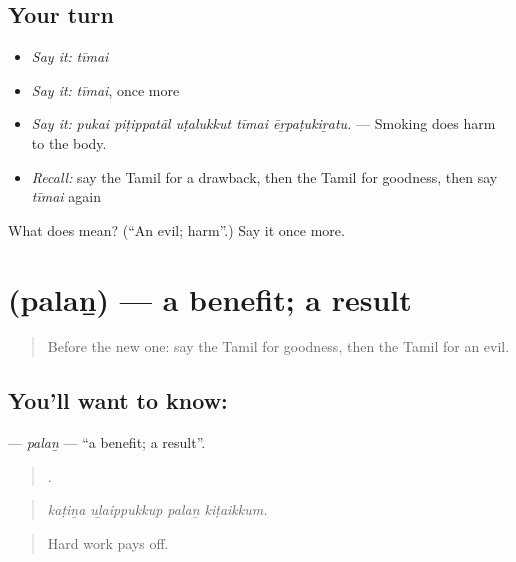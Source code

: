 \subsection*{Your turn}
\begin{itemize}
\raggedright
  \item \emph{Say it:} \emph{tīmai}
  \item \emph{Say it:} \emph{tīmai}, once more
  \item \emph{Say it:} \emph{pukai piṭippatāl uṭalukkut tīmai ēṟpaṭukiṟatu.} — Smoking does harm to the body.
  \item \emph{Recall:} say the Tamil for a drawback, then the Tamil for goodness, then say \emph{tīmai} again
\end{itemize}

\begin{tcolorbox}[breakable,colback=teal!4,colframe=teal!35!black,title={Before you move on}]
What does  mean? (\textquotedblleft{}An evil; harm\textquotedblright{}.) Say it once more.
\end{tcolorbox}
\section[\texorpdfstring{\ta{பலன்} (palaṉ)}{பலன் (palaṉ)}]{ (palaṉ) — a benefit; a result}

\label{lesson:TA-C353-palan}



\begin{quote}
Before the new one: say the Tamil for goodness, then the Tamil for an evil.
\end{quote}

\subsection*{You'll want to know: }
\textbf{} — \emph{palaṉ} — \textquotedblleft{}a benefit; a result\textquotedblright{}.

\begin{quote}
   .
\end{quote}

\begin{quote}
\emph{kaṭiṉa uḻaippukkup palaṉ kiṭaikkum.}
\end{quote}

\begin{quote}
Hard work pays off.
\end{quote}

